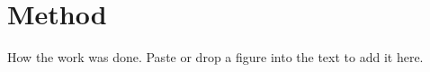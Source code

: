 \chapter{Method}
\label{chap:method}

How the work was done. Paste or drop a figure into the text to add it here.
